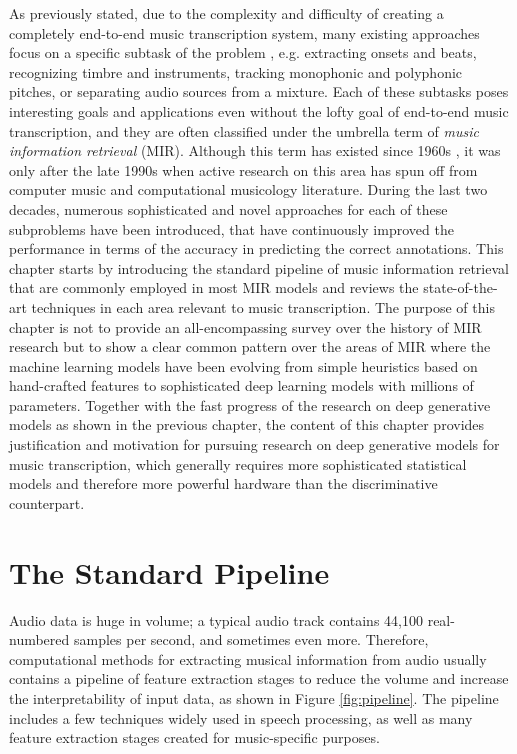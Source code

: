 As previously stated, due to the complexity and difficulty of creating a completely end-to-end music transcription system, many existing approaches focus on a specific subtask of the problem \cite{casey2008mir}, e.g. extracting onsets and beats, recognizing timbre and instruments, tracking monophonic and polyphonic pitches, or separating audio sources from a mixture.
Each of these subtasks poses interesting goals and applications even without the lofty goal of end-to-end music transcription, and they are often classified under the umbrella term of \emph{music information retrieval} (MIR).
Although this term has existed since 1960s \cite{kassler1966mir}, it was only after the late 1990s when active research on this area has spun off from computer music and computational musicology literature.
During the last two decades, numerous sophisticated and novel approaches for each of these subproblems have been introduced, that have continuously improved the performance in terms of the accuracy in predicting the correct annotations.
This chapter starts by introducing the standard pipeline of music information retrieval that are commonly employed in most MIR models and reviews the state-of-the-art techniques in each area relevant to music transcription.
The purpose of this chapter is not to provide an all-encompassing survey over the history of MIR research but to show a clear common pattern over the areas of MIR where the machine learning models have been evolving from simple heuristics based on hand-crafted features to sophisticated deep learning models with millions of parameters.
Together with the fast progress of the research on deep generative models as shown in the previous chapter, the content of this chapter provides justification and motivation for pursuing research on deep generative models for music transcription, which generally requires more sophisticated statistical models and therefore more powerful hardware than the discriminative counterpart.


\section{The Standard Pipeline}

Audio data is huge in volume; a typical audio track contains 44,100 real-numbered samples per second, and sometimes even more.
Therefore, computational methods for extracting musical information from audio usually contains a pipeline of feature extraction stages to reduce the volume and increase the interpretability of input data, as shown in Figure \ref{fig:pipeline}.
The pipeline includes a few techniques widely used in speech processing, as well as many feature extraction stages created for music-specific purposes.

